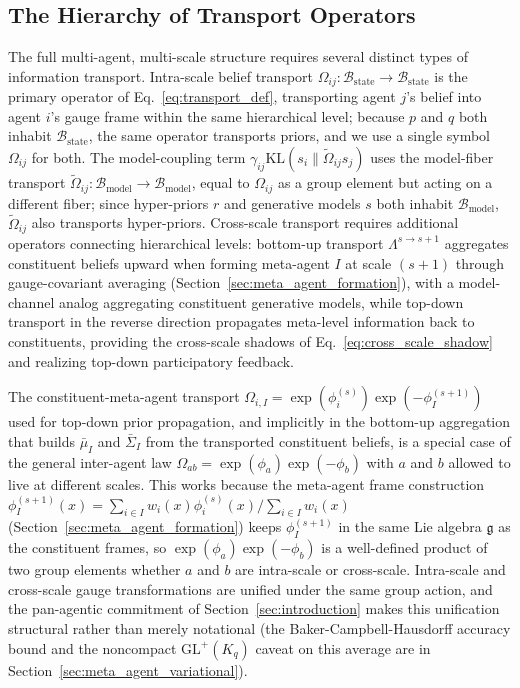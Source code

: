\documentclass[11pt]{article}
\begin{document}
\subsection{The Hierarchy of Transport Operators}
\label{sec:transport_hierarchy}

The full multi-agent, multi-scale structure requires several distinct types of information transport. Intra-scale belief transport $\Omega_{ij}: \mathcal{B}_{\mathrm{state}} \to \mathcal{B}_{\mathrm{state}}$ is the primary operator of Eq.~\eqref{eq:transport_def}, transporting agent $j$'s belief into agent $i$'s gauge frame within the same hierarchical level; because $p$ and $q$ both inhabit $\mathcal{B}_{\mathrm{state}}$, the same operator transports priors, and we use a single symbol $\Omega_{ij}$ for both. The model-coupling term $\gamma_{ij}\mathrm{KL}(s_i\|\tilde{\Omega}_{ij}s_j)$ uses the model-fiber transport $\tilde{\Omega}_{ij}: \mathcal{B}_{\mathrm{model}} \to \mathcal{B}_{\mathrm{model}}$, equal to $\Omega_{ij}$ as a group element but acting on a different fiber; since hyper-priors $r$ and generative models $s$ both inhabit $\mathcal{B}_{\mathrm{model}}$, $\tilde{\Omega}_{ij}$ also transports hyper-priors. Cross-scale transport requires additional operators connecting hierarchical levels: bottom-up transport $\Lambda^{s \to s+1}$ aggregates constituent beliefs upward when forming meta-agent $I$ at scale $(s{+}1)$ through gauge-covariant averaging (Section~\ref{sec:meta_agent_formation}), with a model-channel analog aggregating constituent generative models, while top-down transport in the reverse direction propagates meta-level information back to constituents, providing the cross-scale shadows of Eq.~\eqref{eq:cross_scale_shadow} and realizing top-down participatory feedback.

The constituent-meta-agent transport $\Omega_{i,I} = \exp(\phi_i^{(s)})\exp(-\phi_I^{(s+1)})$ used for top-down prior propagation, and implicitly in the bottom-up aggregation that builds $\bar{\mu}_I$ and $\bar{\Sigma}_I$ from the transported constituent beliefs, is a special case of the general inter-agent law $\Omega_{ab} = \exp(\phi_a)\exp(-\phi_b)$ with $a$ and $b$ allowed to live at different scales. This works because the meta-agent frame construction $\phi_I^{(s+1)}(x) = \sum_{i \in I} w_i(x)\phi_i^{(s)}(x) / \sum_{i \in I} w_i(x)$ (Section~\ref{sec:meta_agent_formation}) keeps $\phi_I^{(s+1)}$ in the same Lie algebra $\mathfrak{g}$ as the constituent frames, so $\exp(\phi_a)\exp(-\phi_b)$ is a well-defined product of two group elements whether $a$ and $b$ are intra-scale or cross-scale. Intra-scale and cross-scale gauge transformations are unified under the same group action, and the pan-agentic commitment of Section~\ref{sec:introduction} makes this unification structural rather than merely notational (the Baker-Campbell-Hausdorff accuracy bound and the noncompact $\mathrm{GL}^+(K_q)$ caveat on this average are in Section~\ref{sec:meta_agent_variational}).
\end{document}
